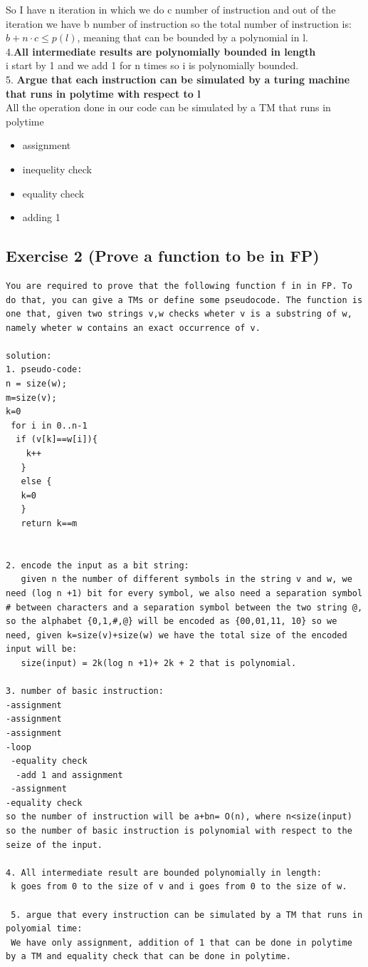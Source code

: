 So I have n iteration in which we do c number of instruction and out of the iteration we have b number of instruction so the total number of instruction is: \(b+n\cdot c \leq p(l)\), meaning that can be bounded by a polynomial in l.\\
4.\textbf{All intermediate results are polynomially bounded in length}\\
i start by 1 and we add 1 for n times so i is polynomially bounded.\\
5. \textbf{Argue that each instruction can be simulated by a turing machine that runs in polytime with respect to l}\\
All the operation done in our code can be simulated by a TM that runs in polytime
\begin{itemize}
	\item assignment
	\item inequelity check
	\item equality check
	\item adding 1
\end{itemize}

\subsection{Exercise 2 (Prove a function to be in FP)}
\begin{lstlisting}[breaklines]
You are required to prove that the following function f in in FP. To do that, you can give a TMs or define some pseudocode. The function is one that, given two strings v,w checks wheter v is a substring of w, namely wheter w contains an exact occurrence of v.

solution:
1. pseudo-code:
n = size(w);
m=size(v);
k=0
 for i in 0..n-1
  if (v[k]==w[i]){
    k++
   }
   else {
   k=0
   }
   return k==m
   
   
2. encode the input as a bit string:
   given n the number of different symbols in the string v and w, we need (log n +1) bit for every symbol, we also need a separation symbol # between characters and a separation symbol between the two string @, so the alphabet {0,1,#,@} will be encoded as {00,01,11, 10} so we need, given k=size(v)+size(w) we have the total size of the encoded input will be:
   size(input) = 2k(log n +1)+ 2k + 2 that is polynomial.

3. number of basic instruction:
-assignment
-assignment
-assignment
-loop 
 -equality check
  -add 1 and assignment
 -assignment
-equality check
so the number of instruction will be a+bn= O(n), where n<size(input) so the number of basic instruction is polynomial with respect to the seize of the input.

4. All intermediate result are bounded polynomially in length:
 k goes from 0 to the size of v and i goes from 0 to the size of w.
 
 5. argue that every instruction can be simulated by a TM that runs in polyomial time:
 We have only assignment, addition of 1 that can be done in polytime by a TM and equality check that can be done in polytime.
\end{lstlisting}

